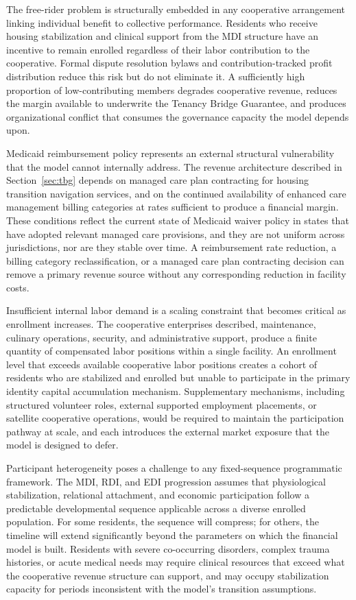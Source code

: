 \documentclass[12pt, letterpaper]{article}
\begin{document}
The free-rider problem is structurally embedded in any cooperative arrangement linking individual benefit to collective performance. Residents who receive housing stabilization and clinical support from the MDI structure have an incentive to remain enrolled regardless of their labor contribution to the cooperative. Formal dispute resolution bylaws and contribution-tracked profit distribution reduce this risk but do not eliminate it. A sufficiently high proportion of low-contributing members degrades cooperative revenue, reduces the margin available to underwrite the Tenancy Bridge Guarantee, and produces organizational conflict that consumes the governance capacity the model depends upon.

Medicaid reimbursement policy represents an external structural vulnerability that the model cannot internally address. The revenue architecture described in Section~\ref{sec:tbg} depends on managed care plan contracting for housing transition navigation services, and on the continued availability of enhanced care management billing categories at rates sufficient to produce a financial margin. These conditions reflect the current state of Medicaid waiver policy in states that have adopted relevant managed care provisions, and they are not uniform across jurisdictions, nor are they stable over time. A reimbursement rate reduction, a billing category reclassification, or a managed care plan contracting decision can remove a primary revenue source without any corresponding reduction in facility costs.

Insufficient internal labor demand is a scaling constraint that becomes critical as enrollment increases. The cooperative enterprises described, maintenance, culinary operations, security, and administrative support, produce a finite quantity of compensated labor positions within a single facility. An enrollment level that exceeds available cooperative labor positions creates a cohort of residents who are stabilized and enrolled but unable to participate in the primary identity capital accumulation mechanism. Supplementary mechanisms, including structured volunteer roles, external supported employment placements, or satellite cooperative operations, would be required to maintain the participation pathway at scale, and each introduces the external market exposure that the model is designed to defer.

Participant heterogeneity poses a challenge to any fixed-sequence programmatic framework. The MDI, RDI, and EDI progression assumes that physiological stabilization, relational attachment, and economic participation follow a predictable developmental sequence applicable across a diverse enrolled population. For some residents, the sequence will compress; for others, the timeline will extend significantly beyond the parameters on which the financial model is built. Residents with severe co-occurring disorders, complex trauma histories, or acute medical needs may require clinical resources that exceed what the cooperative revenue structure can support, and may occupy stabilization capacity for periods inconsistent with the model's transition assumptions.
\end{document}
